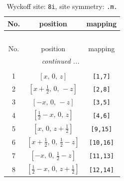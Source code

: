 \documentclass[fleqn,8pt]{jsarticle}
\begin{document}
\begin{longtable}{ccc}
\caption{Wyckoff site: {\tt 8i}, site symmetry: {\tt .m.}}
 \\
 \hline \hline
No. & position & mapping \\ \hline \endfirsthead

\multicolumn{2}{l}{\tablename\ \thetable{}} \\
 \hline \hline
No. & position & mapping \\ \hline \endhead

 \hline \hline
\multicolumn{2}{r}{\footnotesize\it continued ...} \\ \endfoot

 \hline \hline
\multicolumn{2}{r}{} \\ \endlastfoot

1 & $\left[ x,\, 0,\, z \right]$ & {\tt [1,7]} \\ \hline
2 & $\left[ x + \frac{1}{2},\, 0,\, - z \right]$ & {\tt [2,8]} \\ \hline
3 & $\left[ - x,\, 0,\, - z \right]$ & {\tt [3,5]} \\ \hline
4 & $\left[ \frac{1}{2} - x,\, 0,\, z \right]$ & {\tt [4,6]} \\ \hline
5 & $\left[ x,\, 0,\, z + \frac{1}{2} \right]$ & {\tt [9,15]} \\ \hline
6 & $\left[ x + \frac{1}{2},\, 0,\, \frac{1}{2} - z \right]$ & {\tt [10,16]} \\ \hline
7 & $\left[ - x,\, 0,\, \frac{1}{2} - z \right]$ & {\tt [11,13]} \\ \hline
8 & $\left[ \frac{1}{2} - x,\, 0,\, z + \frac{1}{2} \right]$ & {\tt [12,14]} \\
\end{longtable}
\renewcommand{\arraystretch}{1.2}
\end{document}
